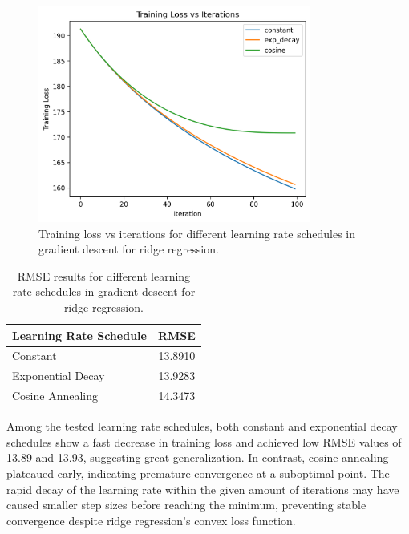 \documentclass[11pt, a4paper]{article}
\begin{document}
\begin{figure}[H]
    \centering
    \includegraphics[width=0.8\textwidth]{./assets/training_loss_comparison.png}
    \caption{Training loss vs iterations for different learning rate schedules in gradient descent for ridge regression.}
    \label{fig:training_loss_comparison}
\end{figure}

\begin{table}[h!]
\centering
\begin{tabular}{|l|c|}
\hline
\textbf{Learning Rate Schedule} & \textbf{RMSE} \\
\hline
Constant & 13.8910 \\
\hline
Exponential Decay & 13.9283 \\
\hline
Cosine Annealing & 14.3473 \\
\hline
\end{tabular}
\caption{RMSE results for different learning rate schedules in gradient descent for ridge regression.}
\label{tab:learning_rate_schedules}
\end{table}

Among the tested learning rate schedules, both constant and exponential decay schedules show a fast decrease in training
loss and achieved low RMSE values of 13.89 and 13.93, suggesting great generalization. In contrast, cosine annealing plateaued early,
indicating premature convergence at a suboptimal point. The rapid decay of the learning rate within the given amount of iterations
may have caused smaller step sizes before reaching the minimum, preventing stable convergence despite ridge regression's convex loss function.
\end{document}
